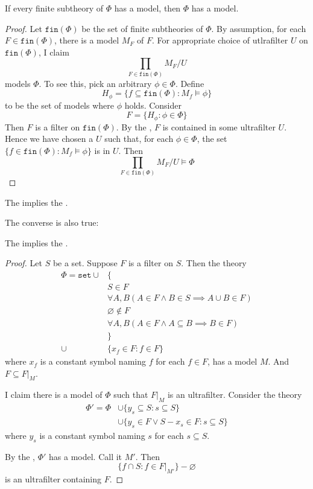 \documentclass{scrartcl}
\begin{document}
\begin{theorem}\label{th:compactness}
  If every finite subtheory of $\Phi$ has a model, then $\Phi$ has a model. 
\end{theorem}
\begin{proof}
  \newcommand{\finof}{\texttt{fin}}
  Let $\finof(\Phi)$ be the set of finite subtheories of $\Phi$. By assumption, for each $F\in\finof(\Phi)$, there is a model $M_F$ of $F$. 
For appropriate choice of utlrafilter $U$ on $\finof(\Phi)$, I claim
\[
\prod_{F\in\finof(\Phi)} M_F/U
\]
models $\Phi$. To see this, pick an arbitrary $\phi \in \Phi$. Define
\[
H_\phi = \{f\subseteq \finof(\Phi): M_f \models \phi\} 
\]
to be the set of models where $\phi$ holds.
Consider
\[
F = \{ H_\phi : \phi \in \Phi\}
\]
Then $F$ is a filter on $\finof(\Phi)$. By the , $F$ is contained in some ultrafilter $U$. Hence
we have chosen a $U$ such that, for each $\phi \in \Phi$, the set $\{f\in \finof(\Phi): M_f\models \phi\}$ is in $U$. Then
\[
\prod_{F\in\finof(\Phi)} M_F/U \models \Phi
\]
\end{proof}
\begin{cor}
  The  implies the . 
\end{cor}
The converse is also true: 
\begin{theorem}
  The  implies the . 
\end{theorem}
\begin{proof}
  \newcommand{\setth}{\texttt{set}}
  Let $S$ be a set. Suppose $F$ is a filter on $S$. Then the theory
  \begin{align*}
    \Phi = \setth \cup &\bigl\{ \\
                          &S\in F \\
                          &\forall A,B (A\in F \wedge B \in S \implies A \cup B \in F ) \\
                          &\varnothing \notin F \\
                          &\forall A,B (A\in F \wedge A \subseteq B \implies B \in F ) \\
                     &\bigr\}\\
    \cup& \{x_f\in F: f\in F\}
  \end{align*}
  where $x_f$ is a constant symbol naming $f$ for each $f\in F$,
  has a model $M$. And $F\subseteq F|_M$. 
  
  I claim there is a model of $\Phi$ such that $F|_M$ is an ultrafilter.  Consider the theory
  \begin{align*}
    \Phi' = \Phi &\cup \{y_s \subseteq S: s\subseteq S\}\\
                 &\cup \{y_s\in F \vee S-x_s \in F : s \subseteq S\}
  \end{align*}
  where $y_s$ is a constant symbol naming $s$ for each $s\subseteq S$. 
  
  By the , $\Phi'$ has a model. Call it $M'$.  Then
  \[
  \{f\cap S:f\in F|_{M'}\} -\varnothing
  \]
  is an ultrafilter containing $F$. 
\end{proof}
\end{document}

